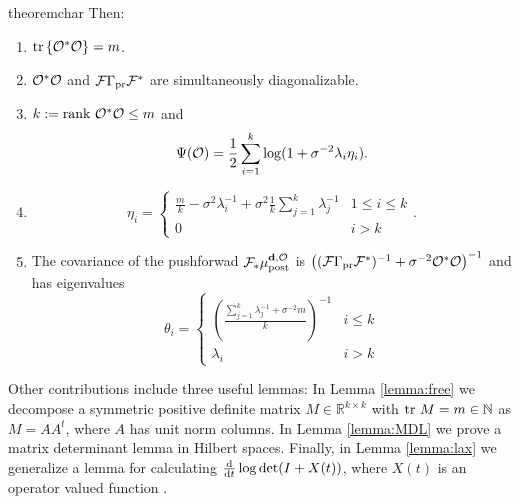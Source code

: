 \begin{restatable}{theorem}{char}
  Then:
  \begin{enumerate}
  \item  $\textup{tr}\left \{\mathcal{O}^*\mathcal{O} \right \} = m$.
  \item $\mathcal{O}^*\mathcal{O}$ and $\mathcal{F}\Gamma_{\textup{pr}}\mathcal{F}^*$ are simultaneously
    diagonalizable.
  \item $k := \textup{rank}\  \mathcal{O}^*\mathcal{O} \leq m$ and
    \begin{equation*}
      \tar(\obs) = \frac12 \sum_{i=1}^{k} \log (1 + \sigma^{-2}\lambda_i\eta_i). %
    \end{equation*}
  \item
    \begin{equation*}
        \eta_i = \begin{cases}
          \frac{m}{k} - \sigma^2 \lambda_i^{-1} + \sigma^2 \frac{1}{k} \sum_{j=1}^k \lambda_j^{-1} & 1 \leq i \leq k \\
          0 & i > k 
        \end{cases}.
    \end{equation*}
  \item The covariance of the pushforwad $\mathcal{F}_{*} \mu_{\textup{post}}^{\mathbf{d}, \mathcal{O}}$ is $\left (
    (\mathcal{F} \Gamma_{\textup{pr}} \mathcal{F}^*)^{-1} + \sigma^{-2} \mathcal{O}^*\mathcal{O} \right )^{-1}$
    and has eigenvalues
    \begin{equation*}
      \theta_i =
      \begin{cases}
        \left(\frac{\sum_{j=1}^k \lambda_j^{-1} + \sigma^{-2}m}{k} \right )^{-1} & i \leq k \\
        \lambda_i &  i > k 
      \end{cases}
    \end{equation*}
  \end{enumerate}
\end{restatable}

Other contributions include three useful lemmas: In Lemma
\ref{lemma:free} we decompose a symmetric positive definite matrix $M
\in \mathbb{R}^{k \times k}$ with $\textup{tr}\ M = m \in \mathbb{N}$ as $M =
AA^t$, where $A$ has unit norm columns. In Lemma \ref{lemma:MDL} we
prove a matrix determinant lemma in Hilbert spaces. Finally, in Lemma
\ref{lemma:lax} we generalize a lemma for calculating
$\frac{\text{\textup{d}}}{\text{\textup{d}} t} \log \det (I + X(t))$, where $X(t)$ is an
operator valued function \cite{Lax07}.


